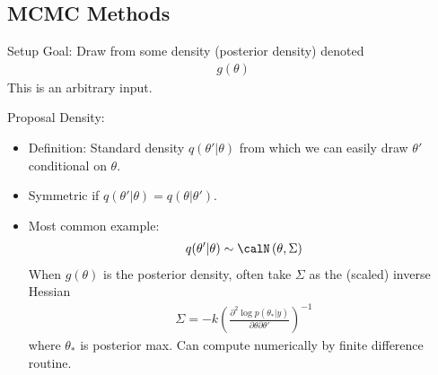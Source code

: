 \documentclass[aspectratio=169, handout]{beamer}
\begin{document}
\subsection{MCMC Methods}


{\footnotesize
\begin{frame}{Setup}
\alert{Goal}: Draw from some density (posterior density) denoted
\begin{align*}
  g(\theta)
\end{align*}
This is an \alert{arbitrary input}.

\alert{Proposal Density}:
\begin{itemize}
  \item Definition:
    Standard density $q(\theta'|\theta)$ from which we can easily draw
    $\theta'$ conditional on $\theta$.

  \item \alert{Symmetric} if $q(\theta'|\theta)=q(\theta|\theta')$.

  \item Most common example:
    \begin{align*}
      q(\theta'|\theta)
      \sim
      \calN\left(
      \theta,\Sigma
      \right)
    \end{align*}
    When $g(\theta)$ is the posterior density, often take $\Sigma$ as
    the (scaled) inverse Hessian
    \begin{align*}
      \Sigma
      =
      -
      k
      \left(
        \frac{\partial^2 \log p(\theta_*|y)}{\partial \theta\partial \theta'}
      \right)^{-1}
    \end{align*}
    where $\theta_*$ is posterior max.
    Can compute numerically by finite difference routine.
\end{itemize}
\end{frame}
}
\end{document}
